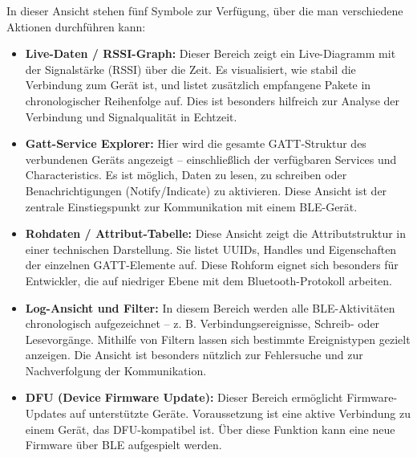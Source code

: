 \vspace{1\baselineskip}

In dieser Ansicht stehen fünf Symbole zur Verfügung, über die man verschiedene Aktionen durchführen kann:

\begin{itemize}
    \item \textbf{Live-Daten / RSSI-Graph:} Dieser Bereich zeigt ein Live-Diagramm mit der Signalstärke (RSSI) über die Zeit. Es visualisiert, wie stabil die Verbindung zum Gerät ist, und listet zusätzlich empfangene Pakete in chronologischer Reihenfolge auf. Dies ist besonders hilfreich zur Analyse der Verbindung und Signalqualität in Echtzeit.\cite{Nordic:Mobile}\cite{Nordic:Mobile:Android}
    
    \item \textbf{Gatt-Service Explorer:} Hier wird die gesamte GATT-Struktur des verbundenen Geräts angezeigt – einschließlich der verfügbaren Services und Characteristics. Es ist möglich, Daten zu lesen, zu schreiben oder Benachrichtigungen (Notify/Indicate) zu aktivieren. Diese Ansicht ist der zentrale Einstiegspunkt zur Kommunikation mit einem BLE-Gerät.\cite{Nordic:Mobile}\cite{Nordic:Mobile:Android}
    
    \item \textbf{Rohdaten / Attribut-Tabelle:} Diese Ansicht zeigt die Attributstruktur in einer technischen Darstellung. Sie listet UUIDs, Handles und Eigenschaften der einzelnen GATT-Elemente auf. Diese Rohform eignet sich besonders für Entwickler, die auf niedriger Ebene mit dem Bluetooth-Protokoll arbeiten.\cite{Nordic:Mobile}\cite{Nordic:Mobile:Android}
    
    \item \textbf{Log-Ansicht und Filter:} In diesem Bereich werden alle BLE-Aktivitäten chronologisch aufgezeichnet – z. B. Verbindungsereignisse, Schreib- oder Lesevorgänge. Mithilfe von Filtern lassen sich bestimmte Ereignistypen gezielt anzeigen. Die Ansicht ist besonders nützlich zur Fehlersuche und zur Nachverfolgung der Kommunikation.\cite{Nordic:Mobile}\cite{Nordic:Mobile:Android}
    
    \item \textbf{DFU (Device Firmware Update):} Dieser Bereich ermöglicht Firmware-Updates auf unterstützte Geräte. Voraussetzung ist eine aktive Verbindung zu einem Gerät, das DFU-kompatibel ist. Über diese Funktion kann eine neue Firmware über BLE aufgespielt werden.\cite{Nordic:Mobile:Android} \cite{Nordic:Mobile}
\end{itemize}

